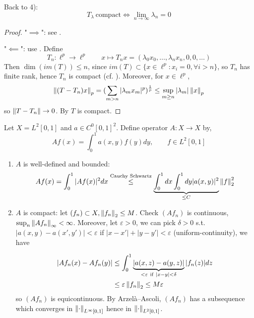\documentclass{article}
\begin{document}
\begin{example}
    Back to  4):  
$$
T_\lambda \ \text{compact} \iff \lim_{n\to \infty}\lambda_n=0
$$  
\end{example}

\begin{proof}
    "$\implies$": see .  

    "$\impliedby$": use . Define  
    $$
    T_n: \ell^p \to \ell^p \qquad x \mapsto T_nx=(\lambda_0x_0,\ldots,\lambda_nx_n,0,0,\ldots)
    $$  
    Then $\dim(im(T))\leq n$, since $im(T)\subset \{x\in \ell^p: x_i=0, \forall i>n\}$, so $T_n$ has finite rank, hence $T_n$ is compact (cf. ).  
    Moreover, for $x\in \ell^p$,  
    $$
    \left\|{(T-T_n)x}\right\|_p = (\sum_{m>n} |\lambda_mx_m|^p)^{\frac{1}{p}} \leq \sup_{m\geq n} |\lambda_m| \left\|{x}\right\|_p
    $$  
    so $\left\|{T-T_n}\right\|\to 0$. By  $T$ is compact.
\end{proof}

\begin{example}\nl
Let $X = L^2[0,1]$ and $a \in C^0[0,1]^2$. Define operator $A:X \to X$ by,  
$$
Af(x) = \int_0^1 a(x,y) f(y)dy, \qquad f\in L^2[0,1]
$$
\begin{enumerate}[1)]
    \item $A$ is well-defined and bounded:  
$$
Af(x) = \int_0^1 |Af(x)|^2 dx \overset{\text{Cauchy\ Schwartz}}{\leq} \underbrace{\int_0^1 dx \int_0^1 dy |a(x,y)|^2}_{\leq C} \left\|{f}\right\|_2^2
$$
\item $A$ is compact: let $(f_n) \subset X, \left\|{f_n}\right\|_2 \leq M$. Check $(Af_n)$ is continuous, $\sup_n \left\|{Af_n}\right\|_{\infty} < \infty$. 
Moreover, let $\varepsilon>0$, we can pick $\delta>0$ s.t. $|a(x,y)-a(x',y')|<\varepsilon$ if $|x-x'|+|y-y'|<\varepsilon$ (uniform-continuity), we have  

\begin{align*}
    |Af_n(x) - Af_n(y)| &\leq \int_0^1 \underbrace{|a(x,z)-a(y,z)|}_{<\varepsilon \ \text{if}\ |x-y|<\delta} |f_n(z)| dz \\
    & \leq \varepsilon \norm{f_n}_2 \leq M\varepsilon
\end{align*}  
so $(Af_n)$ is equicontinuous. By Arzelà–Ascoli, $(Af_n)$ has a subsequence which converges in $\left\|{\cdot}\right\|_{L^{\infty}[0,1]}$ hence in $\left\|{\cdot}\right\|_{L^{2}[0,1]}$.
\end{enumerate}


\end{example}
\end{document}
